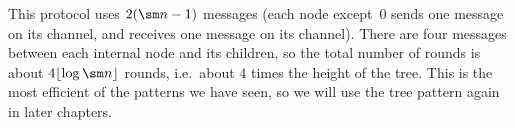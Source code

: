 This protocol uses $2(\sm n-1)$ messages (each node except~0 sends one message
on its  channel, and receives one message on its 
channel).  There are four messages between each internal node and its
children, so the total number of rounds is about $4\lfloor \log \sm n \rfloor$
rounds, i.e.~about $4$ times the height of the tree.  This is the most
efficient of the patterns we have seen, so we will use the tree pattern again
in later chapters.
